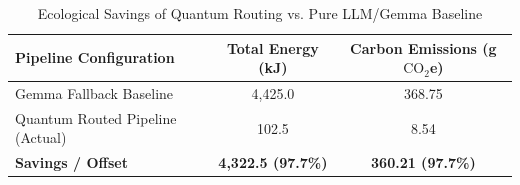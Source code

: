 \begin{table}[h]
\centering
\caption{Ecological Savings of Quantum Routing vs. Pure LLM/Gemma Baseline}
\label{tab:ecological_savings}
\begin{tabular}{l S[table-format=6.1] S[table-format=6.2]}
\toprule
\textbf{Pipeline Configuration} & \textbf{Total Energy (kJ)} & \textbf{Carbon Emissions (g $\text{CO}_2$e)} \\
\midrule
Gemma Fallback Baseline         & 4,425.0                    & 368.75 \\
Quantum Routed Pipeline (Actual) & 102.5                      & 8.54 \\
\midrule
\textbf{Savings / Offset}       & \textbf{4,322.5 (97.7\%)}  & \textbf{360.21 (97.7\%)} \\
\bottomrule
\end{tabular}
\end{table}
